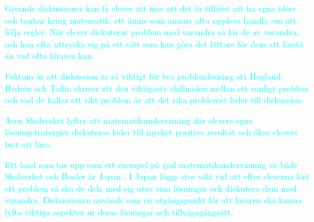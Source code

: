 \textcolor{cyan} {
Givande diskussioner kan få elever att inse att det är tillåtet att ha egna idéer och tankar kring matematik, ett ämne som annars ofta upplevs handla om att följa regler. När elever diskuterar problem med varandra så lär de av varandra, och kan ofta uttrycka sig på ett sätt som kan göra det lättare för dem att förstå än vad ofta läraren kan.  \cite{TheElephant}
}

\textcolor{cyan} {
Faktum är att diskussion är så viktigt för bra problemlösning att Hagland, Hedrén och Taflin skriver att den viktigaste skillnaden mellan ett vanligt problem och vad de kallar ett rikt problem är att det rika problemet leder till diskussion. \cite{RikaProblem}
}

\textcolor{cyan} {
Även Skolverket lyfter att matematikundervisning där elevers egna lösningstratergier diskuteras leder till mycket positiva resultat och ökar elevers lust att lära. \cite{Skolverket03}
}

\textcolor{cyan} {
Ett land som tas upp som ett exempel på god matematikundervisning av både Skolverket och Boaler är Japan \cite{TheElephant}. I Japan läggs stor vikt vid att efter eleverna löst ett problem så ska de dela med sig utav sina lösningar och diskutera dem med varandra. Diskussionen används som en utgångspunkt för att läraren ska kunna lyfta viktiga aspekter ur deras lösningar och tillvägagångsätt. \cite{Skolverket03}
}




